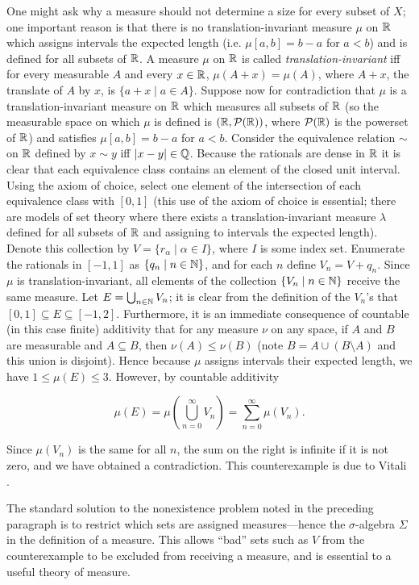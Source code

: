 \documentclass{article}
\theoremstyle{definition}
\newcommand{\bldset}[2]{\{{#1}\mid{#2}\}}
\begin{document}
One might ask why a measure should not determine a size for every subset of $X$; one important reason is that there is no translation-invariant measure $\mu$ on $\mathbb{R}$ which assigns intervals the expected length (i.e. $\mu [a,b] = b - a$ for $a < b$) and is defined for all subsets of $\mathbb{R}$. A measure $\mu$ on $\mathbb{R}$ is called {\em translation-invariant} iff for every measurable $A$ and every $x \in \mathbb{R}$, $\mu(A + x) = \mu(A)$, where $A + x$, the translate of $A$ by $x$, is $\bldset{a + x}{a \in A}$. Suppose now for contradiction that $\mu$ is a translation-invariant measure on $\mathbb{R}$ which measures all subsets of $\mathbb{R}$ (so the measurable space on which $\mu$ is defined is $(\mathbb{R}, \mathcal P(\mathbb{R}))$, where $\mathcal P(\mathbb{R})$ is the powerset of $\mathbb{R}$) and satisfies $\mu [a,b] = b - a$ for $a < b$. Consider the equivalence relation $\sim$ on $\mathbb{R}$ defined by $x \sim y$ iff $|x - y| \in \mathbb{Q}$. Because the rationals are dense in $\mathbb{R}$ it is clear that each equivalence class contains an element of the closed unit interval. Using the axiom of choice, select one element of the intersection of each equivalence class with $[0,1]$ (this use of the axiom of choice is essential; there are models of set theory where there exists a translation-invariant measure $\lambda$ defined for all subsets of $\mathbb{R}$ and assigning to intervals the expected length). Denote this collection by $V = \bldset{r_\alpha}{\alpha \in I}$, where $I$ is some index set. Enumerate the rationals in $[-1,1]$ as $\bldset{q_n}{n \in \N}$, and for each $n$ define $V_n = V + q_n$. Since $\mu$ is translation-invariant, all elements of the collection $\bldset{V_n}{n \in \N}$ receive the same measure. Let $E = \bigcup_{n \in \mathbb{N}} V_n$; it is clear from the definition of the $V_n$'s that $[0,1] \subseteq E \subseteq [-1,2]$. Furthermore, it is an immediate consequence of countable (in this case finite) additivity that for any measure $\nu$ on any space, if $A$ and $B$ are measurable and $A \subseteq B$, then $\nu(A) \le \nu(B)$ (note $B = A \cup (B \setminus A)$ and this union is disjoint). Hence because $\mu$ assigns intervals their expected length, we have $1 \le \mu(E) \le 3$. However, by countable additivity

\[ \mu(E) = \mu\left(\bigcup_{n=0}^\infty V_n\right) = \sum_{n=0}^\infty \mu(V_n). \]

Since $\mu(V_n)$ is the same for all $n$, the sum on the right is infinite if it is not zero, and we have obtained a contradiction. This counterexample is due to Vitali \cite{vitali}.

The standard solution to the nonexistence problem noted in the preceding paragraph is to restrict which sets are assigned measures---hence the $\sigma$-algebra $\Sigma$ in the definition of a measure. This allows ``bad'' sets such as $V$ from the counterexample to be excluded from receiving a measure, and is essential to a useful theory of measure.
\end{document}
